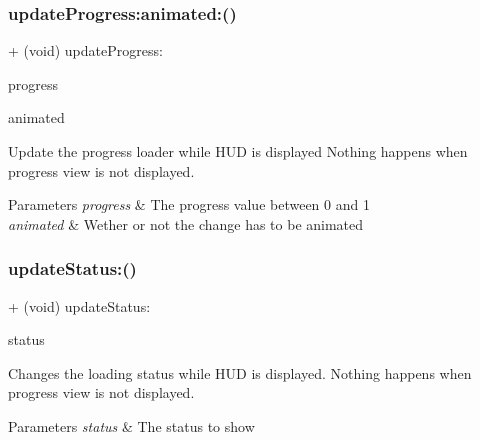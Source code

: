 \subsubsection{\texorpdfstring{update\+Progress\+:animated\+:()}{updateProgress:animated:()}\hspace{0.1cm}{\footnotesize\ttfamily [3/3]}}
{\footnotesize\ttfamily + (void) update\+Progress\+: \begin{DoxyParamCaption}\item[{(C\+G\+Float)}]{progress }\item[{animated:(B\+O\+OL)}]{animated }\end{DoxyParamCaption}}

Update the progress loader while H\+UD is displayed Nothing happens when progress view is not displayed. 
\begin{DoxyParams}{Parameters}
{\em progress} & The progress value between 0 and 1 \\
\hline
{\em animated} & Wether or not the change has to be animated \\
\hline
\end{DoxyParams}
\mbox{\label{interface_k_v_n_progress_ab50b37330761d25ce8b261290537da1a}} 
\subsubsection{\texorpdfstring{update\+Status\+:()}{updateStatus:()}\hspace{0.1cm}{\footnotesize\ttfamily [1/3]}}
{\footnotesize\ttfamily + (void) update\+Status\+: \begin{DoxyParamCaption}\item[{(N\+S\+String $\ast$)}]{status }\end{DoxyParamCaption}}

Changes the loading status while H\+UD is displayed. Nothing happens when progress view is not displayed. 
\begin{DoxyParams}{Parameters}
{\em status} & The status to show \\
\hline
\end{DoxyParams}
\mbox{\label{interface_k_v_n_progress_ab50b37330761d25ce8b261290537da1a}} 
